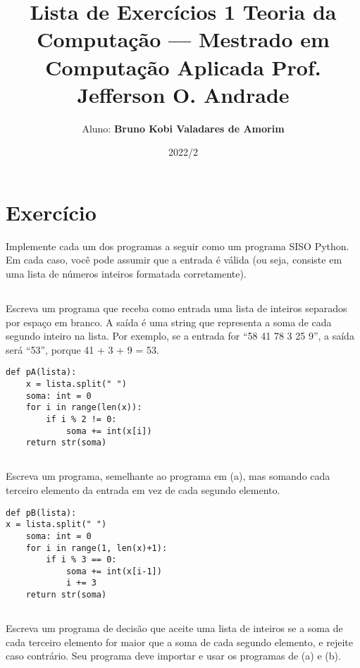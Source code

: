 \documentclass[12pt]{scrartcl}
\begin{document}
\author{Aluno: \textbf{Bruno Kobi Valadares de Amorim}}


\title{Lista de Exercícios 1 \newline\newline
\large Teoria da Computação — Mestrado em Computação Aplicada\newline
\large Prof. Jefferson O. Andrade\newline
}
\date{2022/2}
\maketitle

\section{Exercício}
Implemente cada um dos programas a seguir como um programa SISO Python. Em cada
caso, você pode assumir que a entrada é válida (ou seja, consiste em uma lista de números
inteiros formatada corretamente).

\subsection{}
Escreva um programa que receba como entrada uma lista de inteiros separados por
espaço em branco. A saída é uma string que representa a soma de cada segundo
inteiro na lista. Por exemplo, se a entrada for “58 41 78 3 25 9”, a saída será “53”,
porque 41 + 3 + 9 = 53.

\begin{verbatim}
def pA(lista):
    x = lista.split(" ")
    soma: int = 0
    for i in range(len(x)):
        if i % 2 != 0:
            soma += int(x[i])
    return str(soma)
\end{verbatim}

\subsection{}
 Escreva um programa, semelhante ao programa em (a), mas somando cada terceiro
elemento da entrada em vez de cada segundo elemento.
\begin{verbatim}
def pB(lista):
x = lista.split(" ")
    soma: int = 0
    for i in range(1, len(x)+1):
        if i % 3 == 0:
            soma += int(x[i-1])
            i += 3
    return str(soma)
\end{verbatim}


\subsection{}
Escreva um programa de decisão que aceite uma lista de inteiros se a soma de cada
terceiro elemento for maior que a soma de cada segundo elemento, e rejeite caso
contrário. Seu programa deve importar e usar os programas de (a) e (b).
\end{document}
